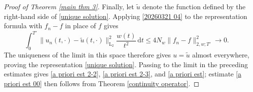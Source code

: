 \documentclass[11pt,reqno]{amsart}
\theoremstyle{definition}
\theoremstyle{remark}
\numberwithin{equation}{section}
\begin{document}
\begin{proof}[Proof of Theorem \ref{main thm 3}]
Finally, let $\widetilde u$ denote the function defined by the right-hand
side of \eqref{unique solution}. Applying \eqref{20260321 04} to the
representation formula with $f_n-f$ in place of $f$ gives
$$
\int_0^{T'}
\|u_n(t,\cdot)-\widetilde u(t,\cdot)\|_{\mathrm L_2}^2
\frac{w(t)}{t^2}\,\mathrm{d}t
\leq
4N_w\|f_n-f\|_{2,w;T'}^2
\longrightarrow0.
$$
The uniqueness of the limit in this space therefore gives
$u=\widetilde u$ almost everywhere, proving the representation
\eqref{unique solution}. Passing to the limit in the preceding
estimates gives \eqref{a priori est 2-2},
\eqref{a priori est 2-3}, and \eqref{a priori est}; estimate
\eqref{a priori est 00} then follows from Theorem
\ref{continuity operator}.




\end{proof}




\end{document}
